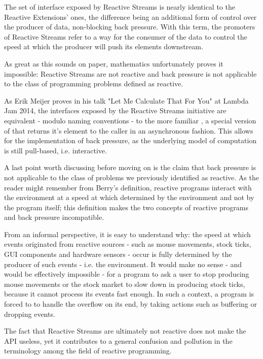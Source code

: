 The set of interface exposed by Reactive Streams is nearly identical to the Reactive Extensions' ones, the difference being an additional form of control over the producer of data, non-blocking back pressure. With this term, the promoters of Reactive Streams refer to a way for the consumer of the data to control the speed at which the producer will push its elements downstream. 

As great as this sounds on paper, mathematics unfortunately proves it impossible: Reactive Streams are not reactive and back pressure is not applicable to the class of programming problems defined as reactive.

As Erik Meijer proves in his talk "Let Me Calculate That For You" at Lambda Jam 2014\cite{meijer2014reactive}, the interfaces exposed by the Reactive Streams initiative are equivalent - modulo naming conventions - to the more familiar , a special version of  that returns it's element to the caller in an asynchronous fashion. This allows for the implementation of back pressure, as the underlying model of computation is still pull-based, i.e. interactive.

A last point worth discussing before moving on is the claim that back pressure is not applicable to the class of problems we previously identified as reactive. As the reader might remember from Berry's definition, reactive programs interact with the environment at a speed at which determined by the environment and not by the program itself\cite{berry1991reactive}; this definition makes the two concepts of reactive programs and back pressure incompatible. 

From an informal perspective, it is easy to understand why: the speed at which events originated from reactive sources - such as mouse movements, stock ticks, GUI components and hardware sensors - occur is fully determined by the producer of such events - i.e. the environment. It would make no sense - and would be effectively impossible - for a program to ask a user to stop producing mouse movements or the stock market to slow down in producing stock ticks, because it cannot process its events fast enough. In such a context, a program is forced to to handle the overflow on its end, by taking actions such as buffering or dropping events.

The fact that Reactive Streams are ultimately not reactive does not make the API useless, yet it contributes to a general confusion and pollution in the terminology among the field of reactive programming.

